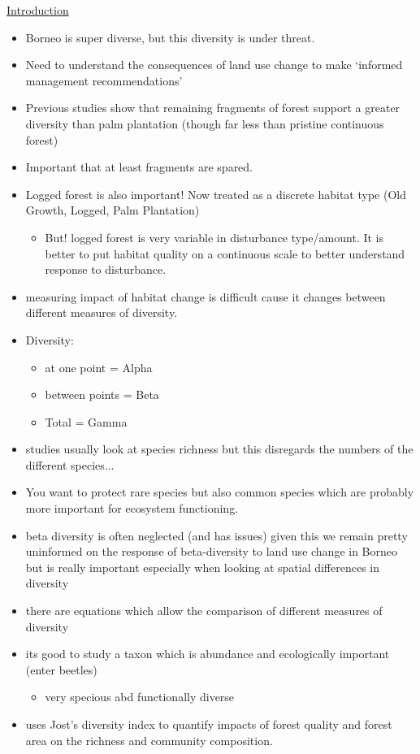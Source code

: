 \underline{Introduction}
\begin{itemize}
	\item Borneo is super diverse, but this diversity is under threat.
	\item Need to understand the consequences of land use change to make `informed management recommendations'
	\item Previous studies show that remaining fragments of forest support a greater diversity than palm plantation (though far less than pristine continuous forest)
	\item Important that at least fragments are spared.
	\item Logged forest is also important! Now treated as a discrete habitat type (Old Growth, Logged, Palm Plantation)
	\begin{itemize}
		\item But! logged forest is very variable in disturbance type/amount. It is better to put habitat quality on a continuous scale to better understand response to disturbance.
	\end{itemize}
	\item measuring impact of habitat change is difficult cause it changes between different measures of diversity.
	\item Diversity:
	\begin{itemize}
		\item at one point = Alpha
		\item between points = Beta
		\item Total = Gamma
	\end{itemize}
	\item studies usually look at species richness but this disregards the numbers of the different species...
	\item You want to protect rare species but also common species which are probably more important for ecosystem functioning.
	\item beta diversity is often neglected (and has issues) given this we remain pretty uninformed on the response of beta-diversity to land use change in Borneo but is really important especially when looking at spatial differences in diversity
	\item there are equations which allow the comparison of different measures of diversity
	\item its good to study a taxon which is abundance and ecologically important (enter beetles)
	\begin{itemize}
		\item very specious abd functionally diverse
	\end{itemize}
	\item uses Jost's diversity index to quantify impacts of forest quality and forest area on the richness and community composition.
\end{itemize}

